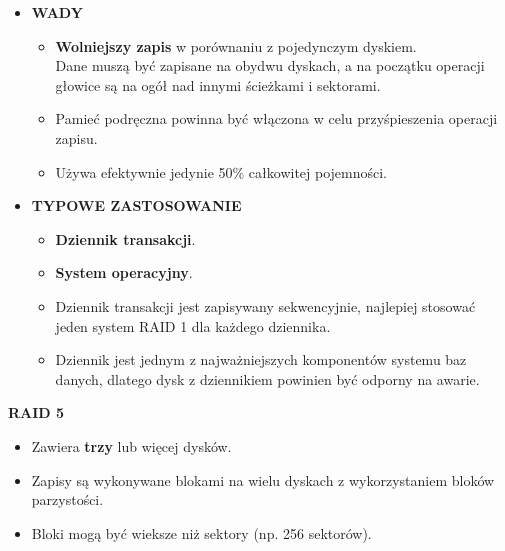 \begin{itemize}
    \item \textbf{WADY}
    \begin{itemize}
        \item \textbf{Wolniejszy zapis} w porównaniu z pojedynczym
              dyskiem.\\
              Dane muszą być zapisane na obydwu dyskach, a na początku
              operacji głowice są na ogół nad innymi ścieżkami i sektorami.
        \item Pamieć podręczna powinna być włączona w celu przyśpieszenia
              operacji zapisu.
        \item Używa efektywnie jedynie 50\% całkowitej pojemności.
    \end{itemize}

    \item \textbf{TYPOWE ZASTOSOWANIE}
    \begin{itemize}
        \item \textbf{Dziennik transakcji}.
        \item \textbf{System operacyjny}.
        \item Dziennik transakcji jest zapisywany sekwencyjnie, najlepiej
              stosować jeden system RAID 1 dla każdego dziennika.
        \item Dziennik jest jednym z najważniejszych komponentów systemu
              baz danych, dlatego dysk z dziennikiem powinien być odporny
              na awarie.
    \end{itemize}

\end{itemize}

\pagebreak

\textbf{RAID 5}
\begin{itemize}
    \item Zawiera \textbf{trzy} lub więcej dysków.
    \item Zapisy są wykonywane blokami na wielu dyskach z wykorzystaniem
          bloków parzystości.
    \item Bloki mogą być wieksze niż sektory (np. 256 sektorów).
\end{itemize}

